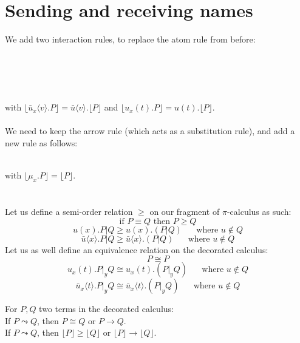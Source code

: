 \documentclass[a4paper,12pt]{article}
\begin{document}
\section{Sending and receiving names}
We add two interaction rules, to replace the atom rule from before:\\~\\
\indent\hfill\begin{prooftree}
\end{prooftree}\hfill
\begin{prooftree}
\end{prooftree}\hfill~\\~\\~\\
with $\lfloor \bar{u}_x\langle v\rangle.P \rfloor = \bar{u}\langle v\rangle.\lfloor P\rfloor$ and $\lfloor u_x(t).P \rfloor = u(t).\lfloor P \rfloor$.\\~\\
We need to keep the arrow rule (which acts as a substitution rule), and add a new rule as follows:\\~\\
\indent\hfill\begin{prooftree}
\end{prooftree}\hfill with $\lfloor \mu_x.P \rfloor = \lfloor P \rfloor$.\hfill~\\~\\~\\
Let us define a semi-order relation $\geq$ on our fragment of $\pi$-calculus as such:\\
\[\text{if }P \equiv Q\text{ then }P \geq Q\]
\[u(x).P | Q \geq u(x).(P|Q)\;\;\;\;\;\;\text{where }u\not\in Q\]
\[\bar{u}\langle x\rangle.P | Q \geq \bar{u}\langle x\rangle.(P|Q)\;\;\;\;\;\;\text{where }u\not\in Q\]
Let us as well define an equivalence relation on the decorated calculus:
\[P \cong P\]
\[u_x(t).P |_y Q \cong u_x(t).(P |_y Q)\;\;\;\;\;\;\text{where }u\not\in Q\]
\[\bar{u}_x\langle t\rangle.P |_y Q \cong \bar{u}_x\langle t\rangle.(P |_y Q)\;\;\;\;\;\;\text{where }u\not\in Q\]
\begin{proposition}
For $P,Q$ two terms in the decorated calculus:\\
If $P \leadsto Q$, then $P \cong Q$ or $P \to Q$.\\
If $P \leadsto Q$, then $\lfloor P \rfloor \geq \lfloor Q \rfloor$ or $\lfloor P \rfloor \to \lfloor Q \rfloor$.
\end{proposition}
\end{document}
